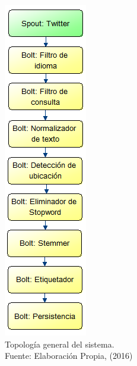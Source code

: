 \begin{figure}[H]
	\centering
	\captionsetup{justification=centering}
	\includegraphics[scale=0.8]{images/TopologiaGeneral.png}
	\caption[Topología general del sistema.]{Topología general del sistema.\\Fuente: Elaboración Propia, (2016)}
	\label{fig:TopologiaGeneral}
\end{figure}





